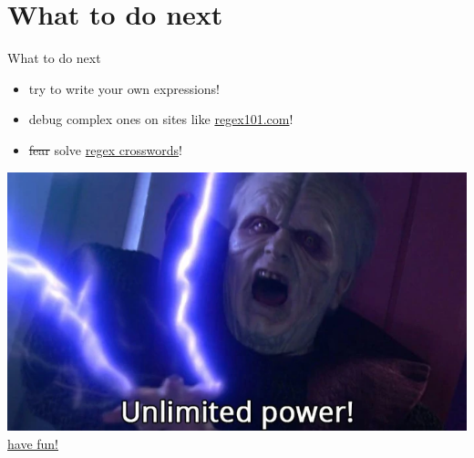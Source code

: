 \documentclass[10pt, graphics, aspectratio=169, table]{beamer}
\begin{document}
    \section{What to do next}
    \begin{frame}{What to do next}
        \begin{itemize}
            \item try to write your own expressions!
            \item debug complex ones on sites like \href{https://regex101.com}{regex101.com}!
            \item \sout{fear} solve \href{https://regexcrossword.com/}{regex crosswords}!
        \end{itemize}
        \begin{center}
            \includegraphics[scale=0.3]{img/unlimited_power.png} \\
            \tiny\href{https://star-wars-memes.fandom.com/wiki/Unlimited_power!}{have fun!}
        \end{center}
    \end{frame}
\end{document}
